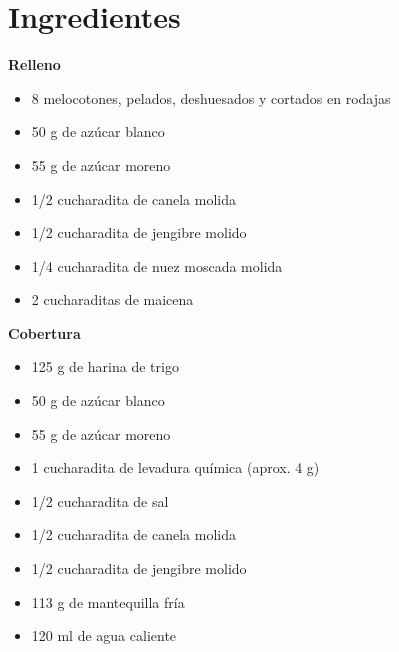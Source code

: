 
\begin{minipage}[t]{0.35\textwidth}

    \section*{Ingredientes}

    \textbf{Relleno}

    \begin{itemize}[leftmargin=*]

        \item 8 melocotones, pelados, deshuesados y cortados en rodajas

        \item 50 g de azúcar blanco

        \item 55 g de azúcar moreno

        \item 1/2 cucharadita de canela molida

        \item 1/2 cucharadita de jengibre molido

        \item 1/4 cucharadita de nuez moscada molida

        \item 2 cucharaditas de maicena

    \end{itemize}

    \textbf{Cobertura}

    \begin{itemize}[leftmargin=*]

        \item 125 g de harina de trigo

        \item 50 g de azúcar blanco

        \item 55 g de azúcar moreno

        \item 1 cucharadita de levadura química (aprox. 4 g)

        \item 1/2 cucharadita de sal

        \item 1/2 cucharadita de canela molida

        \item 1/2 cucharadita de jengibre molido

        \item 113 g de mantequilla fría

        \item 120 ml de agua caliente

    \end{itemize}

\end{minipage}

